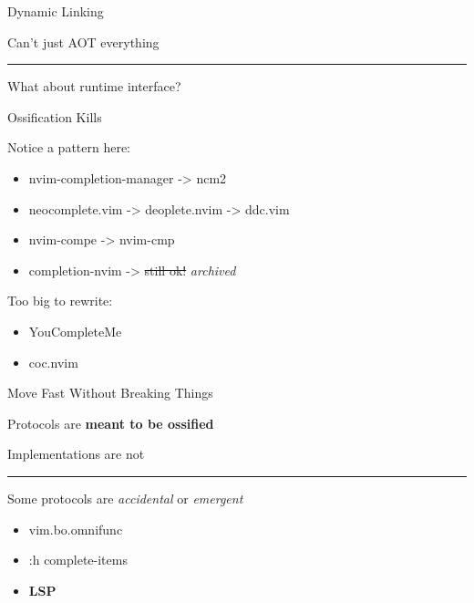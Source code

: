 \documentclass{beamer}
\begin{document}
\begin{frame}{Dynamic Linking}

	Can't just AOT everything

	\rule{\textwidth}{0.1em}

	What about runtime interface?

\end{frame}


\begin{frame}{Ossification Kills}

	Notice a pattern here:

	\begin{itemize}

		\item nvim-completion-manager -> ncm2

		\item neocomplete.vim -> deoplete.nvim -> ddc.vim

		\item nvim-compe -> nvim-cmp

		\item completion-nvim -> \st{still ok!} \textit{archived}

	\end{itemize}

	Too big to rewrite:

	\begin{itemize}

		\item YouCompleteMe

		\item coc.nvim

	\end{itemize}

\end{frame}


\begin{frame}[standout]

	Move Fast Without Breaking Things

\end{frame}


\begin{frame}{Protocols are \textbf{meant to be ossified}}

	Implementations are not

	\rule{\textwidth}{0.1em}

	Some protocols are \textit{accidental} or \textit{emergent}

	\begin{itemize}

		\item vim.bo.omnifunc

		\item :h complete-items

		\item \textbf{LSP}

	\end{itemize}

\end{frame}
\end{document}
